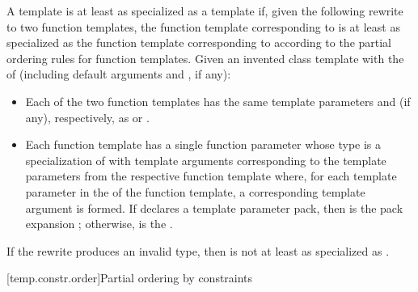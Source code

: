 \documentclass{wg21}
\begin{document}
\pnum
A template   is
at least as specialized as a template  
if, given the following rewrite to two function templates,
the function template corresponding to 
is at least as specialized as
the function template corresponding to 
according to the partial ordering rules
for function templates.
Given an invented class template 
with the  of  (including default arguments
and , if any):

\begin{itemize}
    \item
    Each of the two function templates has the same template parameters
    and  (if any),
    respectively, as  or .
    \item
    Each function template has a single function parameter
    whose type is a specialization of 
    with template arguments corresponding to the template parameters
    from the respective function template where,
    for each template parameter 
    in the  of the function template,
    a corresponding template argument  is formed.
    If  declares a template parameter pack,
    then  is the pack expansion ;
    otherwise,  is the  .
\end{itemize}
If the rewrite produces an invalid type,
then  is not at least as specialized as .


[temp.constr.order]{Partial ordering by constraints}
\end{document}

